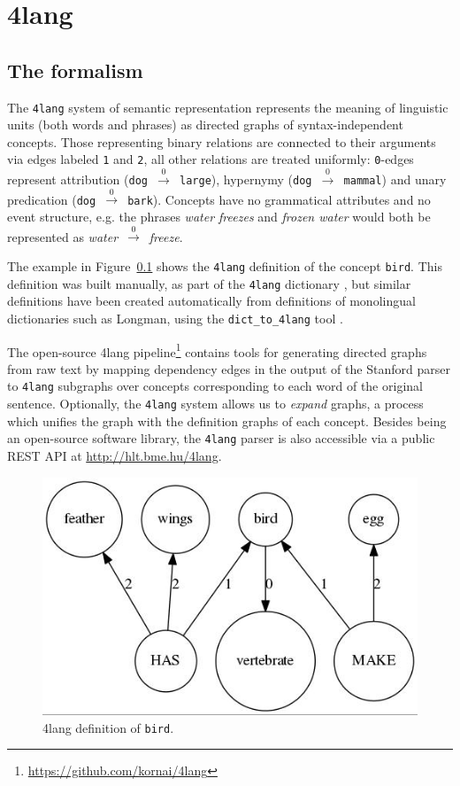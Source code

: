 \chapter*{4lang}
\section{The formalism}
The \texttt{4lang} system of semantic representation \cite{Kornai:2015a}
represents the meaning of linguistic units (both words and phrases)
as directed graphs of syntax-independent concepts.
Those representing binary relations are connected to their arguments
via edges labeled \texttt{1} and \texttt{2}, all other relations are treated
uniformly: \texttt{0}-edges represent attribution (\texttt{dog
	$\xrightarrow0$ large}), hypernymy (\texttt{dog $\xrightarrow0$ mammal}) and unary predication
(\texttt{dog  $\xrightarrow0$ bark}).
Concepts have no grammatical attributes and no event structure, e.g.
the phrases \textit{water freezes} and \textit{frozen water} would both be
represented as \textit{water}~$\xrightarrow0$~\textit{freeze}. 

The example in
Figure~\ref{fig:bird} shows the \texttt{4lang} definition of the
concept \texttt{bird}. This definition was built manually, as part of
the \texttt{4lang} dictionary \cite{Kornai:2013}, but similar
definitions have been created automatically from definitions of
monolingual dictionaries such as Longman, using the
\texttt{dict\_to\_4lang} tool \cite{Recski:2016d}.

The open-source 4lang pipeline\footnote{\url{https://github.com/kornai/4lang}}
contains tools for generating
directed graphs from raw text by mapping dependency edges in the output of the
Stanford parser \cite{deMarneffe:2006} to \texttt{4lang} subgraphs over
concepts corresponding to each word of the original sentence.
Optionally, the \texttt{4lang} system allows us to \textit{expand}
graphs, a process which unifies the graph with the definition graphs of
each concept. 
Besides being an open-source software library,
the \texttt{4lang} parser is also accessible via a public
REST API at \url{http://hlt.bme.hu/4lang}.

\begin{figure}
	\centering
	\includegraphics[scale=0.5]{figures/bird}
	\caption{4lang definition of \texttt{bird}.}
	\label{fig:bird}
\end{figure}


